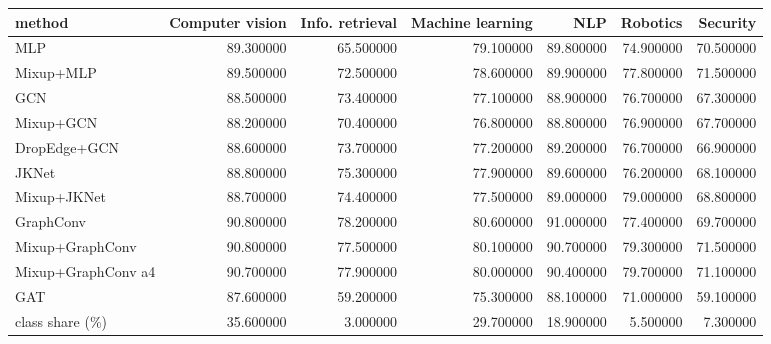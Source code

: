 \begin{tabular}{lrrrrrr}
\toprule
method & Computer vision & Info. retrieval & Machine learning & NLP & Robotics & Security \\
\midrule
MLP & 89.300000 & 65.500000 & 79.100000 & 89.800000 & 74.900000 & 70.500000 \\
Mixup+MLP & 89.500000 & 72.500000 & 78.600000 & 89.900000 & 77.800000 & 71.500000 \\
GCN & 88.500000 & 73.400000 & 77.100000 & 88.900000 & 76.700000 & 67.300000 \\
Mixup+GCN & 88.200000 & 70.400000 & 76.800000 & 88.800000 & 76.900000 & 67.700000 \\
DropEdge+GCN & 88.600000 & 73.700000 & 77.200000 & 89.200000 & 76.700000 & 66.900000 \\
JKNet & 88.800000 & 75.300000 & 77.900000 & 89.600000 & 76.200000 & 68.100000 \\
Mixup+JKNet & 88.700000 & 74.400000 & 77.500000 & 89.000000 & 79.000000 & 68.800000 \\
GraphConv & 90.800000 & 78.200000 & 80.600000 & 91.000000 & 77.400000 & 69.700000 \\
Mixup+GraphConv & 90.800000 & 77.500000 & 80.100000 & 90.700000 & 79.300000 & 71.500000 \\
Mixup+GraphConv a4 & 90.700000 & 77.900000 & 80.000000 & 90.400000 & 79.700000 & 71.100000 \\
GAT & 87.600000 & 59.200000 & 75.300000 & 88.100000 & 71.000000 & 59.100000 \\
class share (\%) & 35.600000 & 3.000000 & 29.700000 & 18.900000 & 5.500000 & 7.300000 \\
\bottomrule
\end{tabular}
